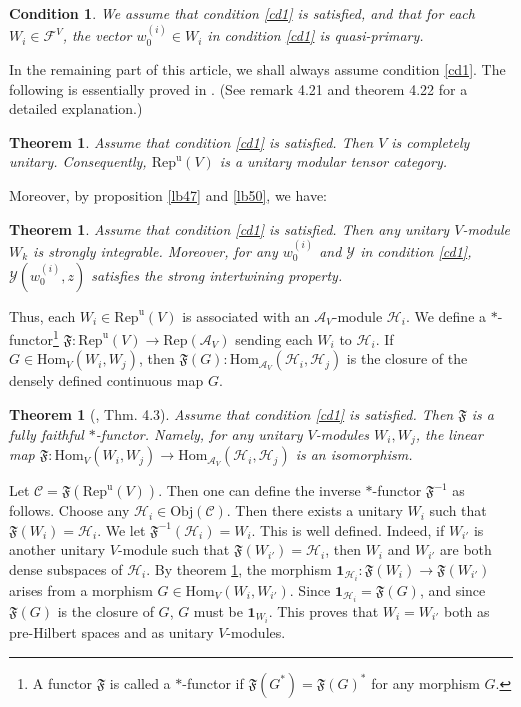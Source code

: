 \documentclass[11pt,b5paper,notitlepage]{article}
\theoremstyle{definition}
\theoremstyle{plain}
\newtheorem{thm}[df]{Theorem}
\newtheorem{cond}{Condition}
\newcommand{\fk}{\mathfrak}
\newcommand{\mc}{\mathcal}
\newcommand{\id}{\mathbf{1}}
\newcommand{\Hom}{\mathrm{Hom}}
\newcommand{\Rep}{\mathrm{Rep}}
\newcommand{\scr}{\mathscr}
\newcommand{\RepuV}{\mathrm{Rep}^{\mathrm u}(V)}
\newcommand{\Obj}{\mathrm{Obj}}
\numberwithin{equation}{subsection}
\begin{document}
\begin{cond}\label{cd2}
We assume that condition \ref{cd1} is satisfied, and that for each $W_i\in\mc F^V$, the vector $w^{(i)}_0\in W_i$ in condition \ref{cd1} is quasi-primary.
\end{cond}

In the remaining part of this article,  we shall always assume  condition \ref{cd1}. The following is essentially proved in \cite{Gui19b}. (See \cite{Gui21a} remark 4.21 and theorem 4.22 for a detailed explanation.)

\begin{thm}\label{lb51}
Assume that condition \ref{cd1} is satisfied.  Then $V$ is completely unitary. Consequently, $\RepuV$ is a unitary modular tensor category.
\end{thm} 

Moreover, by proposition \ref{lb47} and  \ref{lb50}, we have:

\begin{thm}\label{lb55}
Assume that condition \ref{cd1} is satisfied. Then any unitary $V$-module $W_k$ is strongly integrable. Moreover, for any $w^{(i)}_0$ and $\mc Y$ in condition \ref{cd1}, $\mc Y(w^{(i)}_0,z)$ satisfies the strong intertwining property.
\end{thm}




Thus,  each $W_i\in\RepuV$ is associated with an $\mc A_V$-module $\mc H_i$. We define a $*$-functor\footnote{A functor $\fk F$ is called a $*$-functor if $\fk F(G^*)=\fk F(G)^*$ for any morphism $G$.} $\fk F:\RepuV\rightarrow \Rep(\mc A_V)$ sending each $W_i$ to $\mc H_i$. If $G\in\Hom_V(W_i,W_j)$, then $\fk F(G):\Hom_{\mc A_V}(\mc H_i,\mc H_j)$ is the closure of the densely defined continuous map $G$.

\begin{thm}[\cite{CWX}, \cite{Gui19b} Thm. 4.3]\label{lb54}
Assume that condition \ref{cd1} is satisfied. Then $\fk F$ is a fully faithful $*$-functor. Namely, for any unitary $V$-modules $W_i,W_j$, the linear map $\fk F:\Hom_V(W_i,W_j)\rightarrow\Hom_{\mc A_V}(\mc H_i,\mc H_j)$ is an isomorphism.
\end{thm}

Let $\scr C=\fk F(\RepuV)$. Then one can define the inverse $*$-functor $\fk F^{-1}$ as follows. Choose any $\mc H_i\in\Obj(\scr C)$. Then there exists a unitary $W_i$ such that $\fk F(W_i)=\mc H_i$. We let $\fk F^{-1}(\mc H_i)=W_i$. This is well defined. Indeed, if $W_{i'}$ is another unitary $V$-module such that $\fk F(W_{i'})=\mc H_i$, then $W_i$ and $W_{i'}$ are both dense subspaces of $\mc H_i$. By theorem \ref{lb54}, the morphism $\id_{\mc H_i}:\fk F(W_i)\rightarrow\fk F(W_{i'})$ arises from a morphism $G\in\Hom_V(W_i,W_{i'})$. Since $\id_{\mc H_i}=\fk F (G)$, and since $\fk F(G)$ is the closure of $G$, $G$ must be $\id_{W_i}$. This proves that $W_i=W_{i'}$ both as pre-Hilbert spaces and as unitary $V$-modules.
\end{document}
